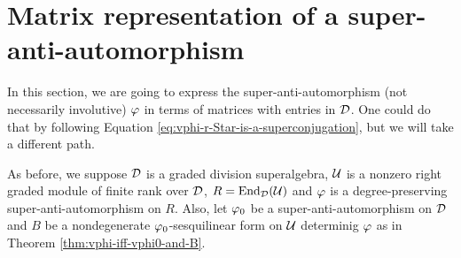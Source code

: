






\section{Matrix representation of a su\-per\--anti\--auto\-mor\-phism}

In this section, we are going to express the super-anti-automorphism (not necessarily involutive) $\varphi$ in terms of matrices with entries in $\mathcal{D}$. 
One could do that by following Equation \eqref{eq:vphi-r-Star-is-a-superconjugation}, but we will take a different path. 

As before, we suppose $\mathcal{D}$ is a graded division superalgebra, $\mathcal U$ is a nonzero right graded module of finite rank over $\mathcal{D}$, $R = \operatorname{End}_{\mathcal{D}} (\mathcal U)$ and $\varphi$ is a degree-preserving super-anti-automorphism on $R$. 
Also, let $\varphi_0$ be a super-anti-automorphism on $\mathcal{D}$ and $B$ be a nondegenerate $\varphi_0$-sesquilinear form on $\mathcal U$ determinig $\varphi$ as in Theorem \ref{thm:vphi-iff-vphi0-and-B}.

